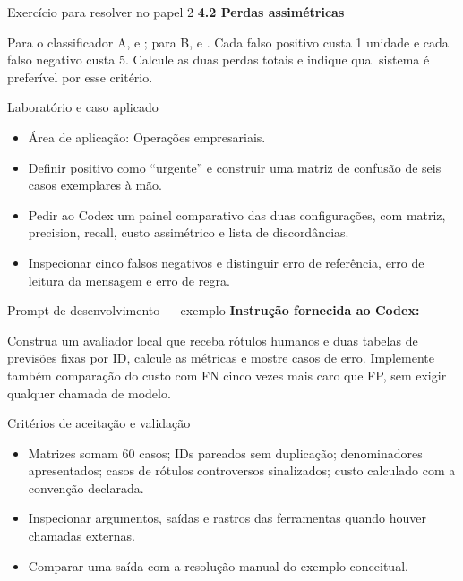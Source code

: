 \documentclass[10pt,aspectratio=169]{beamer}
\begin{document}
\begin{frame}[t]{Exercício para resolver no papel 2}
\small
\small\textbf{4.2 Perdas assimétricas}\par\vspace{4mm}Para o classificador A, e ; para B, e . Cada falso positivo custa 1 unidade e cada falso negativo custa 5. Calcule as duas perdas totais e indique qual sistema é preferível por esse critério.
\end{frame}

\begin{frame}[t]{Laboratório e caso aplicado}
\small
\begin{itemize}
\item Área de aplicação: Operações empresariais.
\item Definir positivo como ``urgente'' e construir uma matriz de confusão de seis casos exemplares à mão.
\item Pedir ao Codex um painel comparativo das duas configurações, com matriz, precision, recall, custo assimétrico e lista de discordâncias.
\item Inspecionar cinco falsos negativos e distinguir erro de referência, erro de leitura da mensagem e erro de regra.
\end{itemize}
\end{frame}

\begin{frame}[t]{Prompt de desenvolvimento — exemplo}
\small
\small\textbf{Instrução fornecida ao Codex:}\par\vspace{5mm}Construa um avaliador local que receba rótulos humanos e duas tabelas de previsões fixas por ID, calcule as métricas e mostre casos de erro. Implemente também comparação do custo com FN cinco vezes mais caro que FP, sem exigir qualquer chamada de modelo.
\end{frame}

\begin{frame}[t]{Critérios de aceitação e validação}
\small
\begin{itemize}
\item Matrizes somam 60 casos; IDs pareados sem duplicação; denominadores apresentados; casos de rótulos controversos sinalizados; custo calculado com a convenção declarada.
\item Inspecionar argumentos, saídas e rastros das ferramentas quando houver chamadas externas.
\item Comparar uma saída com a resolução manual do exemplo conceitual.
\end{itemize}
\end{frame}
\end{document}
